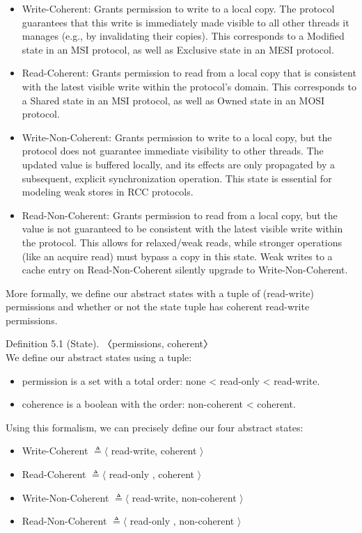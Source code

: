 \documentclass[10pt]{article}
\begin{document}
\begin{itemize}
  \item[-] Write-Coherent: Grants permission to write to a local copy. The protocol guarantees that this write is immediately made visible to all other threads it manages (e.g., by invalidating their copies). This corresponds to a Modified state in an MSI protocol, as well as Exclusive state in an MESI protocol.
  \item[-] Read-Coherent: Grants permission to read from a local copy that is consistent with the latest visible write within the protocol's domain. This corresponds to a Shared state in an MSI protocol, as well as Owned state in an MOSI protocol.
  \item[-] Write-Non-Coherent: Grants permission to write to a local copy, but the protocol does not guarantee immediate visibility to other threads. The updated value is buffered locally, and its effects are only propagated by a subsequent, explicit synchronization operation. This state is essential for modeling weak stores in RCC protocols.
  \item[-] Read-Non-Coherent: Grants permission to read from a local copy, but the value is not guaranteed to be consistent with the latest visible write within the protocol. This allows for relaxed/weak reads, while stronger operations (like an acquire read) must bypass a copy in this state. Weak writes to a cache entry on Read-Non-Coherent silently upgrade to Write-Non-Coherent.
\end{itemize}

More formally, we define our abstract states with a tuple of (read-write) permissions and whether or not the state tuple has coherent read-write permissions.

Definition 5.1 (State). 〈permissions, coherent〉\\
We define our abstract states using a tuple:

\begin{itemize}
  \item[-] permission is a set with a total order: none < read-only < read-write.
  \item[-] coherence is a boolean with the order: non-coherent < coherent.
\end{itemize}

Using this formalism, we can precisely define our four abstract states:

\begin{itemize}
  \item[-] Write-Coherent $\triangleq\langle$ read-write, coherent $\rangle$
  \item[-] Read-Coherent $\triangleq\langle$ read-only , coherent $\rangle$
  \item[-] Write-Non-Coherent $\triangleq\langle$ read-write, non-coherent $\rangle$
  \item[-] Read-Non-Coherent $\triangleq\langle$ read-only , non-coherent $\rangle$
\end{itemize}
\end{document}
